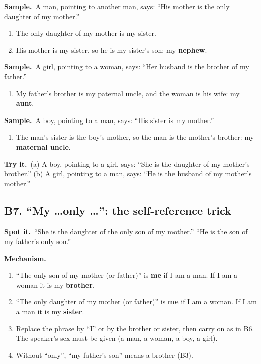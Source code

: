 \documentclass[11pt,a4paper]{article}
\let\oldsubsection\subsection
\renewcommand{\subsection}{\needspace{9\baselineskip}\oldsubsection}
\newcommand{\spot}{\textbf{\color{ember}Spot it.}\ }
\newcommand{\mech}{\textbf{\color{ember}Mechanism.}\ }
\newif\ifkeepsamp
\newcommand{\samp}{\ifkeepsamp\needspace{4\baselineskip}\fi\textbf{\color{ember}Sample.}\ }
\newcommand{\tryit}[1]{\textbf{\color{ember}Try it.}\ #1}
\begin{document}
\samp A man, pointing to another man, says: ``His mother is the only daughter of my mother.''
\begin{enumerate}
\item The only daughter of my mother is my sister.
\item His mother is my sister, so he is my sister's son: my \textbf{nephew}.
\end{enumerate}
\samp A girl, pointing to a woman, says: ``Her husband is the brother of my father.''
\begin{enumerate}
\item My father's brother is my paternal uncle, and the woman is his wife: my \textbf{aunt}.
\end{enumerate}
\samp A boy, pointing to a man, says: ``His sister is my mother.''
\begin{enumerate}
\item The man's sister is the boy's mother, so the man is the mother's brother: my \textbf{maternal uncle}.
\end{enumerate}

\tryit (a) A boy, pointing to a girl, says: ``She is the daughter of my mother's brother.'' (b) A girl, pointing to a man, says: ``He is the husband of my mother's mother.''

\subsection{B7. ``My \dots only \dots'': the self-reference trick}
\spot ``She is the daughter of the only son of my mother.'' ``He is the son of my father's only son.''

\mech
\begin{enumerate}
\item ``The only son of my mother (or father)'' is \textbf{me} if I am a man. If I am a woman it is my \textbf{brother}.
\item ``The only daughter of my mother (or father)'' is \textbf{me} if I am a woman. If I am a man it is my \textbf{sister}.
\item Replace the phrase by ``I'' or by the brother or sister, then carry on as in B6. The speaker's sex must be given (a man, a woman, a boy, a girl).
\item Without ``only'', ``my father's son'' means a brother (B3).
\end{enumerate}
\end{document}
